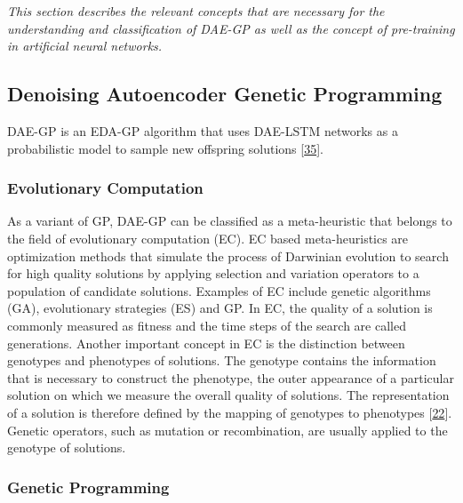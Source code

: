 \documentclass[
  11pt,
]{article}
\begin{document}
\emph{This section describes the relevant concepts that are necessary for the understanding and classification of DAE-GP as well as the concept of pre-training in artificial neural networks.}

\hypertarget{denoising-autoencoder-genetic-programming}{%
\subsection{Denoising Autoencoder Genetic Programming}\label{denoising-autoencoder-genetic-programming}}

DAE-GP is an EDA-GP algorithm that uses DAE-LSTM networks as a probabilistic model to sample new offspring solutions {[}\protect\hyperlink{ref-dae-gp_2020_rtree}{35}{]}.

\hypertarget{evolutionary-computation}{%
\subsubsection{Evolutionary Computation}\label{evolutionary-computation}}

As a variant of GP, DAE-GP can be classified as a meta-heuristic that belongs to the field of evolutionary computation (EC).
EC based meta-heuristics are optimization methods that simulate the process of Darwinian evolution to search for high quality solutions by applying selection and variation operators to a population of candidate solutions.
Examples of EC include genetic algorithms (GA), evolutionary strategies (ES) and GP.
In EC, the quality of a solution is commonly measured as fitness and the time steps of the search are called generations.
Another important concept in EC is the distinction between genotypes and phenotypes of solutions.
The genotype contains the information that is necessary to construct the phenotype, the outer appearance of a particular solution on which we measure the overall quality of solutions.
The representation of a solution is therefore defined by the mapping of genotypes to phenotypes {[}\protect\hyperlink{ref-design_of_modern_heuristics}{22}{]}.
Genetic operators, such as mutation or recombination, are usually applied to the genotype of solutions.

\hypertarget{genetic-programming}{%
\subsubsection{Genetic Programming}\label{genetic-programming}}
\end{document}
